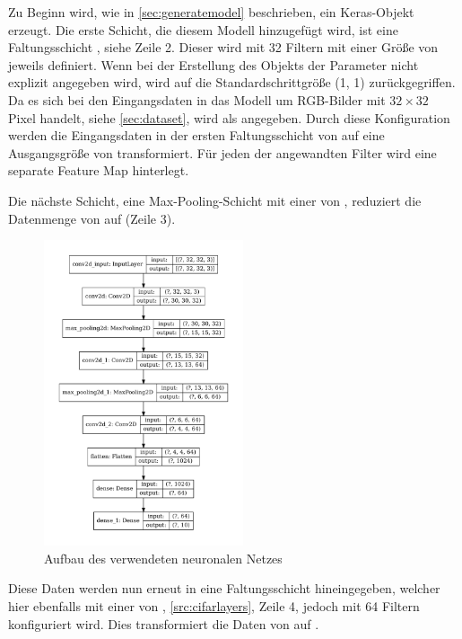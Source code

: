 Zu Beginn wird, wie in \cref{sec:generatemodel} beschrieben, ein Keras-Objekt  erzeugt. Die erste Schicht, die diesem Modell hinzugefügt wird, ist eine Faltungsschicht , siehe Zeile 2. Dieser wird mit 32 Filtern mit einer Größe von jeweils  definiert. Wenn bei der Erstellung des Objekts der Parameter  nicht explizit angegeben wird, wird auf die Standardschrittgröße (1, 1) zurückgegriffen. Da es sich bei den Eingangsdaten in das Modell um RGB-Bilder mit $32 \times 32$ Pixel  handelt, siehe \cref{sec:dataset}, wird als   angegeben. Durch diese Konfiguration werden die Eingangsdaten in der ersten Faltungsschicht von  auf eine Ausgangsgröße von  transformiert. Für jeden der angewandten Filter wird eine separate Feature Map hinterlegt.

Die nächste Schicht, eine Max-Pooling-Schicht mit einer  von , reduziert die Datenmenge von  auf  (Zeile 3).

\begin{figure}[htb]
    \centering
    \includegraphics[trim = 0mm 19mm 0mm 19mm, clip, height=9cm]{Bilder/CUDA/cifar-model-graph-detailed.pdf}
    \caption{Aufbau des verwendeten neuronalen Netzes}
    \label{fig:networklayers}
\end{figure}

Diese Daten werden nun erneut in eine Faltungsschicht hineingegeben, welcher hier ebenfalls mit einer  von , \cref{src:cifarlayers}, Zeile 4, jedoch mit 64 Filtern konfiguriert wird. Dies transformiert die Daten von  auf .

